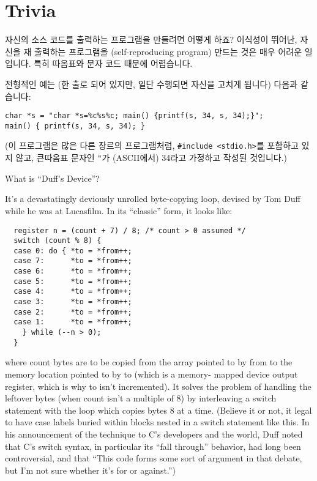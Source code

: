 \section{Trivia}	\label{sec:trivia}
\begin{faq}
	자신의 소스 코드를 출력하는 프로그램을 만들려면 어떻게 하죠?
\A
	이식성이 뛰어난, 자신을 재 출력하는 프로그램을 (self-reproducing
	program) 만드는 것은 매우 어려운 일입니다.  특히 따옴표와
	문자 코드 때문에 어렵습니다.

	전형적인 예는 (한 출로 되어 있지만, 일단 수행되면 자신을 고치게
	됩니다) 다음과 같습니다:
\begin{verbatim}
char *s = "char *s=%c%s%c; main() {printf(s, 34, s, 34);}";
main() { printf(s, 34, s, 34); }
\end{verbatim}

	\noindent (이 프로그램은 많은 다른 장르의 프로그램처럼,
	\verb+#include <stdio.h>+를 포함하고 있지 않고, 큰따옴표 문자인
	\verb+"+가 (ASCII에서) 34라고 가정하고 작성된 것입니다.)
\end{faq}

\begin{faq}
	What is ``Duff's Device''?

\A
	It's a devastatingly deviously unrolled byte-copying loop,
	devised by Tom Duff while he was at Lucasfilm.   In its ``classic''
	form, it looks like:

\begin{verbatim}
  register n = (count + 7) / 8;	/* count > 0 assumed */
  switch (count % 8) {
  case 0: do { *to = *from++;
  case 7:      *to = *from++;
  case 6:      *to = *from++;
  case 5:      *to = *from++;
  case 4:      *to = *from++;
  case 3:      *to = *from++;
  case 2:      *to = *from++;
  case 1:      *to = *from++;
    } while (--n > 0);
  }
\end{verbatim}

	where count bytes are to be copied from the array pointed to by
	from to the memory location pointed to by to (which is a memory-
	mapped device output register, which is why to isn't
	incremented).   It solves the problem of handling the leftover
	bytes (when count isn't a multiple of 8) by interleaving a
	switch statement with the loop which copies bytes 8 at a time.
	(Believe it or not, it  legal to have case labels buried
	within blocks nested in a switch statement like this.   In his
	announcement of the technique to C's developers and the world,
	Duff noted that C's switch syntax, in particular its ``fall
	through'' behavior, had long been controversial, and that ``This
	code forms some sort of argument in that debate, but I'm not
	sure whether it's for or against.'')
\end{faq}

